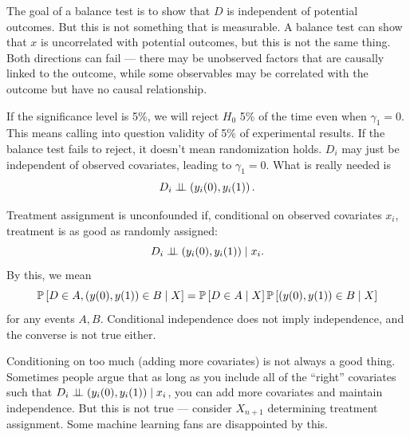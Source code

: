 \begin{remark}
	The goal of a balance test is to show that $D$ is independent of potential outcomes. But this is not something that is measurable.
	A balance test can show that $x$ is uncorrelated with potential outcomes, but this is not the same thing. Both directions can fail --- there may be unobserved factors that are causally linked to the outcome, while some observables may be correlated with the outcome but have no causal relationship.

	If the significance level is 5\%, we will reject $H_0$ 5\% of the time even when $\gamma_1 = 0$. This means calling into question validity of 5\% of experimental results. If the balance test fails to reject, it doesn't mean randomization holds. $D_i$ may just be independent of observed covariates, leading to $\gamma_1 = 0$. What is really needed is
	\[
		D_i \ind \left(y_i(0), y_i(1)\right)
	.\]
\end{remark}

\begin{definition}
	Treatment assignment is unconfounded if, conditional on observed covariates $x_i$, treatment is as good as randomly assigned:
	\[
		D_i \ind \left(y_i(0), y_i(1)\right) \mid x_i
	.\]
	By this, we mean \[
		\P\left[D \in A, \left( y(0),y(1) \right) \in B \mid X\right] = \P\left[D \in A \mid X\right] \P\left[\left( y(0),y(1) \right) \in B \mid X\right] 
	\] for any events $A,B$. Conditional independence does not imply independence, and the converse is not true either.
\end{definition}

\begin{remark}
	Conditioning on too much (adding more covariates) is not always a good thing. Sometimes people argue that as long as you include all of the ``right'' covariates such that $D_i \ind \left( y_i(0), y_i(1) \right) \mid x_i$, you can add more covariates and maintain independence. But this is not true --- consider $X_{n+1}$ determining treatment assignment.
	Some machine learning fans are disappointed by this.
\end{remark}
	
